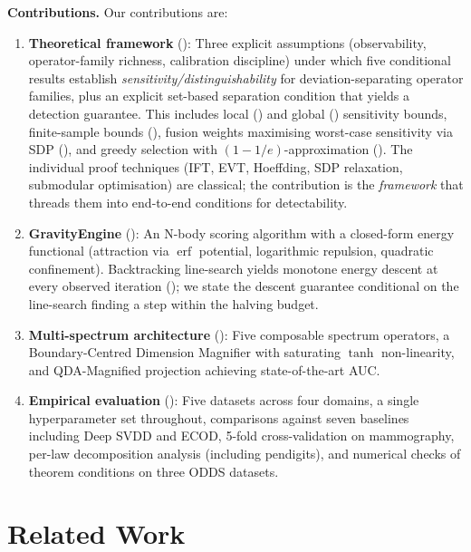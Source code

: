 \documentclass{article}
\DeclareMathOperator{\erf}{erf}
\begin{document}
\textbf{Contributions.} Our contributions are:
\begin{enumerate}[leftmargin=*]
    \item \textbf{Theoretical framework} (): Three explicit assumptions (observability, operator-family richness, calibration discipline) under which five conditional results establish \emph{sensitivity/distinguishability} for deviation-separating operator families, plus an explicit set-based separation condition that yields a detection guarantee. This includes local () and global () sensitivity bounds, finite-sample bounds (), fusion weights maximising worst-case sensitivity via SDP (), and greedy selection with $(1-1/e)$-approximation (). The individual proof techniques (IFT, EVT, Hoeffding, SDP relaxation, submodular optimisation) are classical; the contribution is the \emph{framework} that threads them into end-to-end conditions for detectability.
    \item \textbf{GravityEngine} (): An N-body scoring algorithm with a closed-form energy functional (attraction via $\erf$ potential, logarithmic repulsion, quadratic confinement). Backtracking line-search yields monotone energy descent at every observed iteration (); we state the descent guarantee conditional on the line-search finding a step within the halving budget.
    \item \textbf{Multi-spectrum architecture} (): Five composable spectrum operators, a Boundary-Centred Dimension Magnifier with saturating $\tanh$ non-linearity, and QDA-Magnified projection achieving state-of-the-art AUC.
    \item \textbf{Empirical evaluation} (): Five datasets across four domains, a single hyperparameter set throughout, comparisons against seven baselines including Deep SVDD and ECOD, 5-fold cross-validation on mammography, per-law decomposition analysis (including pendigits), and numerical checks of theorem conditions on three ODDS datasets.
\end{enumerate}

\section{Related Work}
\label{sec:related}
\end{document}
